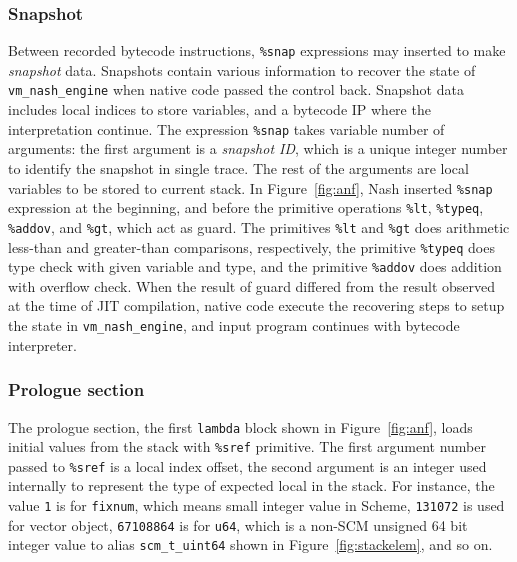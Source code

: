 \documentclass[preprint, 10pt]{sigplanconf}
\begin{document}
\subsubsection{Snapshot}

Between recorded bytecode instructions, \texttt{\%snap} expressions may inserted
to make \textit{snapshot} data. Snapshots contain various information to recover
the state of \texttt{vm\_nash\_engine} when native code passed the control
back. Snapshot data includes local indices to store variables, and a bytecode IP
where the interpretation continue. The expression \texttt{\%snap} takes variable
number of arguments: the first argument is a \textit{snapshot ID}, which is a
unique integer number to identify the snapshot in single trace. The rest of the
arguments are local variables to be stored to current stack. In
Figure~\hyperref[fig:anf]{\ref{fig:anf}}, Nash inserted \texttt{\%snap}
expression at the beginning, and before the primitive operations \texttt{\%lt},
\texttt{\%typeq}, \texttt{\%addov}, and \texttt{\%gt}, which act as guard. The
primitives \texttt{\%lt} and \texttt{\%gt} does arithmetic less-than and
greater-than comparisons, respectively, the primitive \texttt{\%typeq} does type
check with given variable and type, and the primitive \texttt{\%addov} does
addition with overflow check. When the result of guard differed from the result
observed at the time of JIT compilation, native code execute the recovering
steps to setup the state in \texttt{vm\_nash\_engine}, and input program
continues with bytecode interpreter.


\subsubsection{Prologue section}
\label{sec:irprologue}

The prologue section, the first \texttt{lambda} block shown in
Figure~\hyperref[fig:anf]{\ref{fig:anf}}, loads initial values from the stack
with \texttt{\%sref} primitive. The first argument number passed to
\texttt{\%sref} is a local index offset, the second argument is an integer used
internally to represent the type of expected local in the stack. For instance,
the value \texttt{1} is for \texttt{fixnum}, which means small integer value in
Scheme, \texttt{131072} is used for vector object, \texttt{67108864} is for
\texttt{u64}, which is a non-SCM unsigned 64 bit integer value to alias
\texttt{scm\_t\_uint64} shown in
Figure~\hyperref[fig:stackelem]{\ref{fig:stackelem}}, and so on.
\end{document}

